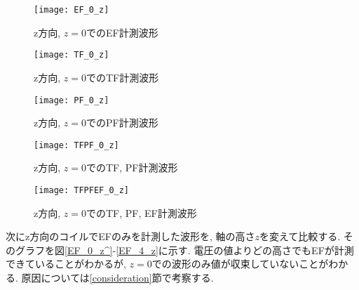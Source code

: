 \documentclass[]{jsarticle}
\begin{document}
		\begin{figure}[htbp]
	
		\begin{minipage}{0.33\hsize}
			\begin{center}
				\texttt{[image: EF\_0\_z]}
				\caption{z方向, $z = 0$でのEF計測波形}
				\label{EF_0_z}
			\end{center}
		\end{minipage}
		\begin{minipage}{0.33\hsize}
			\begin{center}
				\texttt{[image: TF\_0\_z]}
				\caption{z方向, $z = 0$でのTF計測波形}
				\label{TF_0_z}
			\end{center}
		\end{minipage}
		\begin{minipage}{0.33\hsize}
			\begin{center}
				\texttt{[image: PF\_0\_z]}
				\caption{z方向, $z = 0$でのPF計測波形}
				\label{PF_0_z}
			\end{center}
		\end{minipage}
		
		\end{figure}
		
		\begin{figure}[htbp]
		\begin{minipage}{0.5\hsize}
			\begin{center}
				\texttt{[image: TFPF\_0\_z]}
				\caption{z方向, $z = 0$でのTF, PF計測波形}
				\label{TFPF_0_z}
			\end{center}
		\end{minipage}
		\begin{minipage}{0.5\hsize}
			\begin{center}
				\texttt{[image: TFPFEF\_0\_z]}
				\caption{z方向, $z = 0$でのTF, PF, EF計測波形}
				\label{TFPFEF_0_z}
			\end{center}
		\end{minipage}
	\end{figure}

次にz方向のコイルでEFのみを計測した波形を, 軸の高さ$z$を変えて比較する. そのグラフを図\ref{EF_0_z^}-\ref{EF_4_z}に示す. 電圧の値よりどの高さでもEFが計測できていることがわかるが, $z = 0$での波形のみ値が収束していないことがわかる. 原因については\ref{consideration}節で考察する. 
\end{document}
